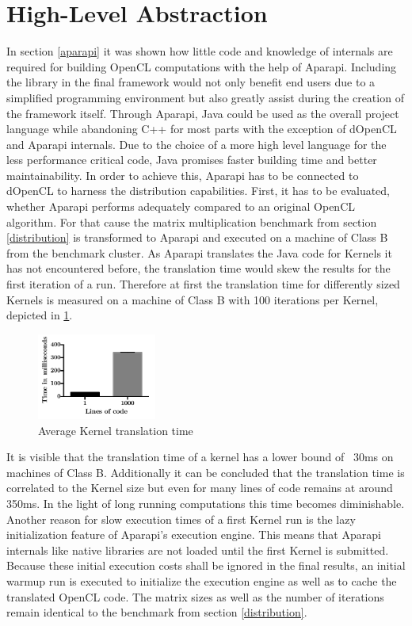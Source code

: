 \section{High-Level Abstraction}
\label{abstraction}

In section \ref{aparapi} it was shown how little code and knowledge of internals are required for building OpenCL computations with the help of Aparapi. Including the library in the final framework would not only benefit end users due to a simplified programming environment but also greatly assist during the creation of the framework itself. Through Aparapi, Java could be used as the overall project language while abandoning C++ for most parts with the exception of dOpenCL and Aparapi internals. Due to the choice of a more high level language for the less performance critical code, Java promises faster building time and better maintainability. In order to achieve this, Aparapi has to be connected to dOpenCL to harness the distribution capabilities. First, it has to be evaluated, whether Aparapi performs adequately compared to an original OpenCL algorithm. For that cause the matrix multiplication benchmark from section \ref{distribution} is transformed to Aparapi and executed on a machine of Class B from the benchmark cluster. As Aparapi translates the Java code for Kernels it has not encountered before, the translation time would skew the results for the first iteration of a run. Therefore at first the translation time for differently sized Kernels is measured on a machine of Class B with 100 iterations per Kernel, depicted in \ref{img:aparapi_translation}.

\begin{figure}[H]
	\includegraphics[width=0.35\textwidth]{images/aparapi_translation.pdf}
	\centering
	\caption{Average Kernel translation time}
	\label{img:aparapi_translation}
\end{figure}

It is visible that the translation time of a kernel has a lower bound of ~30ms on machines of Class B. Additionally it can be concluded that the translation time is correlated to the Kernel size but even for many lines of code remains at around 350ms. In the light of long running computations this time becomes diminishable. Another reason for slow execution times of a first Kernel run is the lazy initialization feature of Aparapi's execution engine. This means that Aparapi internals like native libraries are not loaded until the first Kernel is submitted. Because these initial execution costs shall be ignored in the final results, an initial warmup run is executed to initialize the execution engine as well as to cache the translated OpenCL code. The matrix sizes as well as the number of iterations remain identical to the benchmark from section \ref{distribution}.

